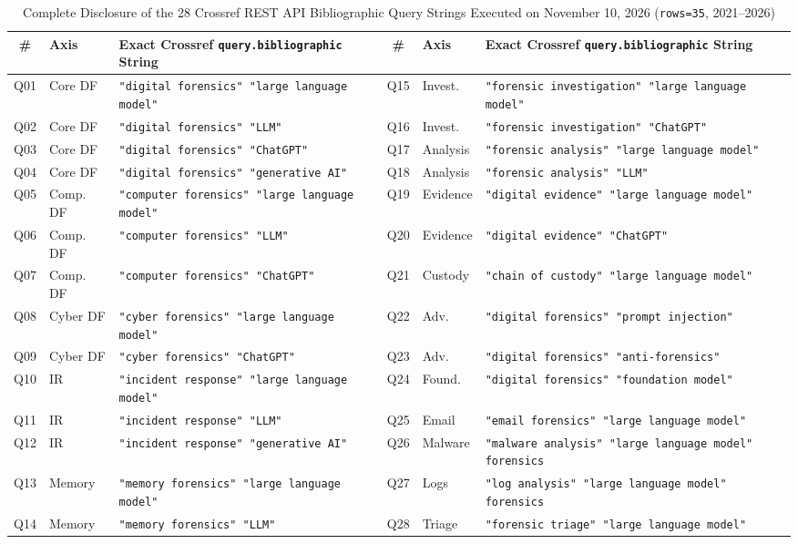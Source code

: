 \begin{table}[!t]
\caption{Complete Disclosure of the 28 Crossref REST API Bibliographic Query Strings Executed on November 10, 2026 (\texttt{rows=35}, 2021--2026)}
\label{tab:query_strings}
\centering
\scriptsize
\setlength{\tabcolsep}{3.5pt}
\begin{tabular}{clp{6.3cm}clp{6.3cm}}
\toprule
\textbf{\#} & \textbf{Axis} & \textbf{Exact Crossref \texttt{query.bibliographic} String} & \textbf{\#} & \textbf{Axis} & \textbf{Exact Crossref \texttt{query.bibliographic} String} \\
\midrule
Q01 & Core DF & \texttt{"digital forensics" "large language model"} & Q15 & Invest. & \texttt{"forensic investigation" "large language model"} \\
Q02 & Core DF & \texttt{"digital forensics" "LLM"} & Q16 & Invest. & \texttt{"forensic investigation" "ChatGPT"} \\
Q03 & Core DF & \texttt{"digital forensics" "ChatGPT"} & Q17 & Analysis & \texttt{"forensic analysis" "large language model"} \\
Q04 & Core DF & \texttt{"digital forensics" "generative AI"} & Q18 & Analysis & \texttt{"forensic analysis" "LLM"} \\
Q05 & Comp. DF & \texttt{"computer forensics" "large language model"} & Q19 & Evidence & \texttt{"digital evidence" "large language model"} \\
Q06 & Comp. DF & \texttt{"computer forensics" "LLM"} & Q20 & Evidence & \texttt{"digital evidence" "ChatGPT"} \\
Q07 & Comp. DF & \texttt{"computer forensics" "ChatGPT"} & Q21 & Custody & \texttt{"chain of custody" "large language model"} \\
Q08 & Cyber DF & \texttt{"cyber forensics" "large language model"} & Q22 & Adv. & \texttt{"digital forensics" "prompt injection"} \\
Q09 & Cyber DF & \texttt{"cyber forensics" "ChatGPT"} & Q23 & Adv. & \texttt{"digital forensics" "anti-forensics"} \\
Q10 & IR & \texttt{"incident response" "large language model"} & Q24 & Found. & \texttt{"digital forensics" "foundation model"} \\
Q11 & IR & \texttt{"incident response" "LLM"} & Q25 & Email & \texttt{"email forensics" "large language model"} \\
Q12 & IR & \texttt{"incident response" "generative AI"} & Q26 & Malware & \texttt{"malware analysis" "large language model" forensics} \\
Q13 & Memory & \texttt{"memory forensics" "large language model"} & Q27 & Logs & \texttt{"log analysis" "large language model" forensics} \\
Q14 & Memory & \texttt{"memory forensics" "LLM"} & Q28 & Triage & \texttt{"forensic triage" "large language model"} \\
\bottomrule
\end{tabular}
\end{table}

